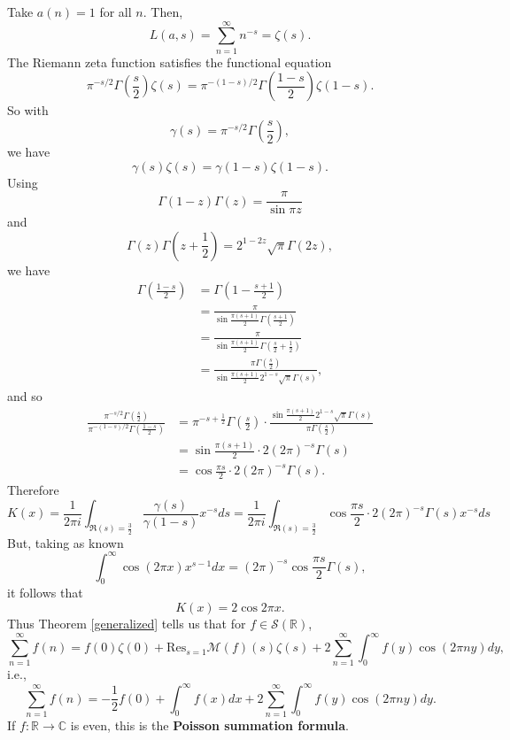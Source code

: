 \documentclass{article}
\newcommand{\Res}{\mathrm{Res}}
\begin{document}
Take $a(n)=1$ for all $n$. Then,
\[
L(a,s)=\sum_{n=1}^\infty n^{-s} = \zeta(s).
\]
The Riemann zeta function satisfies the functional equation
\[
\pi^{-s/2} \Gamma\left( \frac{s}{2} \right) \zeta(s)
=\pi^{-(1-s)/2} \Gamma\left( \frac{1-s}{2} \right) \zeta(1-s).
\]
So with
\[
\gamma(s) = \pi^{-s/2} \Gamma\left( \frac{s}{2} \right),
\]
we have
\[
\gamma(s) \zeta(s) = \gamma(1-s) \zeta(1-s).
\]
Using 
\[
\Gamma(1-z)\Gamma(z) = \frac{\pi}{\sin \pi z}
\]
and
\[
\Gamma(z)\Gamma\left(z+\frac{1}{2}\right) = 2^{1-2z} \sqrt{\pi} \Gamma(2z),
\]
we have
\begin{align*}
\Gamma\left(\frac{1-s}{2}\right)
&=\Gamma\left(1-\frac{s+1}{2}\right)\\
&=\frac{\pi}{\sin \frac{\pi(s+1)}{2} \Gamma\left(\frac{s+1}{2}\right)}\\
&=\frac{\pi}{\sin \frac{\pi(s+1)}{2} \Gamma\left(\frac{s}{2}+\frac{1}{2}\right)}\\
&=\frac{\pi \Gamma\left(\frac{s}{2}\right)}{\sin \frac{\pi(s+1)}{2} 2^{1-s}\sqrt{\pi} \Gamma(s)},
\end{align*}
and so
\begin{align*}
\frac{\pi^{-s/2} \Gamma\left( \frac{s}{2} \right)}{\pi^{-(1-s)/2} \Gamma\left( \frac{1-s}{2} \right)}&=
\pi^{-s+\frac{1}{2}} \Gamma\left( \frac{s}{2} \right) \cdot \frac{\sin \frac{\pi(s+1)}{2} 2^{1-s}\sqrt{\pi} \Gamma(s)}{\pi \Gamma\left(\frac{s}{2}\right)}\\
&=\sin \frac{\pi(s+1)}{2} \cdot 2 (2\pi)^{-s} \Gamma(s)\\
&=\cos \frac{\pi s}{2} \cdot 2 (2\pi)^{-s} \Gamma(s).
\end{align*}
Therefore
\[
K(x) = \frac{1}{2\pi i} \int_{\Re(s)=\frac{3}{2}} \frac{\gamma(s)}{\gamma(1-s)} x^{-s} ds
= \frac{1}{2\pi i} \int_{\Re(s)=\frac{3}{2}} \cos \frac{\pi s}{2} \cdot 2 (2\pi)^{-s} \Gamma(s) x^{-s} ds
\]
But, taking as known
\[
\int_0^\infty \cos(2\pi x) x^{s-1} dx = (2\pi)^{-s} \cos\frac{\pi s}{2} \Gamma(s),
\]
it follows that
\[
K(x) = 2 \cos 2\pi x.
\]
Thus Theorem \ref{generalized} tells us that for $f \in \mathscr{S}(\mathbb{R})$,
\[
\sum_{n=1}^\infty f(n) = f(0)\zeta(0) +\Res_{s=1} \mathscr{M}(f)(s) \zeta(s)
+ 2 \sum_{n=1}^\infty \int_0^\infty f(y) \cos(2\pi ny) dy,
\]
i.e.,
\[
\sum_{n=1}^\infty f(n) = -\frac{1}{2}f(0) + \int_0^\infty f(x) dx 
+ 2 \sum_{n=1}^\infty \int_0^\infty f(y) \cos(2\pi ny) dy.
\]
If $f:\mathbb{R} \to \mathbb{C}$ is even, this is the 
 \textbf{Poisson summation formula}.
\end{document}
